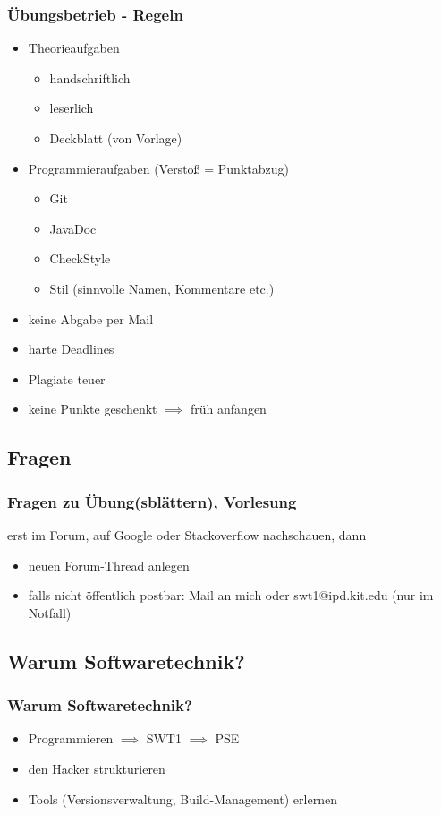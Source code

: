 \documentclass[18pt]{beamer}
\begin{document}
	\begin{frame}
		\frametitle{Übungsbetrieb - Regeln}
		\begin{itemize}
			\item Theorieaufgaben 
			\begin{itemize}
				\item handschriftlich
				\item leserlich
				\item Deckblatt (von Vorlage)
			\end{itemize}
			\pause
			\item Programmieraufgaben (Verstoß = Punktabzug)
			\begin{itemize}
				\item Git
				\item JavaDoc
				\item CheckStyle
				\item Stil (sinnvolle Namen, Kommentare etc.)
			\end{itemize}
			\pause
			\item keine Abgabe per Mail \pause
			\item harte Deadlines \pause
			\item Plagiate teuer \pause
			\item keine Punkte geschenkt $\implies$ früh anfangen
		\end{itemize}
	\end{frame}
		
		
		
	\subsection{Fragen}
		\begin{frame}
			\frametitle{Fragen zu Übung(sblättern), Vorlesung}
			erst im Forum, auf Google oder Stackoverflow nachschauen, dann
				\begin{itemize}
					\item neuen Forum-Thread anlegen
					\item falls nicht öffentlich postbar: Mail an mich oder swt1@ipd.kit.edu (nur im Notfall)
				\end{itemize}
		\end{frame}
		
	\subsection{Warum Softwaretechnik?}
		\begin{frame}
			\frametitle{Warum Softwaretechnik?}
			\begin{itemize}
				\item Programmieren $\implies$ SWT1 $\implies$ PSE \pause
				\item den Hacker strukturieren \pause
				\item Tools (Versionsverwaltung, Build-Management) erlernen
			\end{itemize}
		\end{frame}
		
\end{document}

